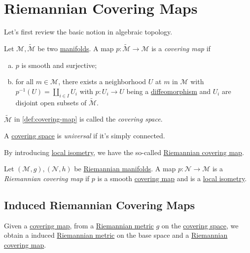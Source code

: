 \section{Riemannian Covering Maps}
Let's first review the basic notion in algebraic topology.

\begin{definition}\label{def:covering-map}
	Let \(\mathcal{M} , \widetilde{\mathcal{M}} \) be two \hyperref[def:topological-manifold]{manifolds}. A map \(p\colon \widetilde{\mathcal{M}} \to \mathcal{M} \) is a \emph{covering map} if
	\begin{enumerate}[(a)]
		\item \(p\) is smooth and surjective;
		\item for all \(m\in \mathcal{M} \), there exists a neighborhood \(U\) at \(m\) in \(\mathcal{M} \) with \(p ^{-1} (U) = \coprod_{i\in I} U_i\) with \(p\colon U_i \to U\) being a \hyperref[def:diffeomorphism]{diffeomorphism} and \(U_i\) are disjoint open subsets of \(\widetilde{\mathcal{M}} \).
	\end{enumerate}
\end{definition}

\begin{notation}\label{not:covering-space}
	\(\widetilde{\mathcal{M}} \) in \autoref{def:covering-map} is called the \emph{covering space}.
\end{notation}

\begin{notation}\label{not:universal-covering-space}
	A \hyperref[not:covering-space]{covering space} is \emph{universal}	if it's simply connected.
\end{notation}

By introducing \hyperref[def:local-isometry]{local isometry}, we have the so-called \hyperref[def:Riemannian-covering-map]{Riemannian covering map}.

\begin{definition}\label{def:Riemannian-covering-map}
	Let \((\mathcal{M} , g), (\mathcal{N}, h )\) be \hyperref[def:Riemannian-manifold]{Riemannian manifolds}. A map \(p\colon \mathcal{N} \to \mathcal{M} \) is a \emph{Riemannian covering map} if \(p\) is a smooth \hyperref[def:covering-map]{covering map} and is a \hyperref[def:local-isometry]{local isometry}.
\end{definition}

\subsection{Induced Riemannian Covering Maps}
Given a \hyperref[def:covering-map]{covering map}, from a \hyperref[def:Riemannian-metric]{Riemannian metric} \(g\) on the \hyperref[not:covering-space]{covering space}, we obtain a induced \hyperref[def:Riemannian-metric]{Riemannian metric} on the base space and a \hyperref[def:Riemannian-covering-map]{Riemannian covering map}.

